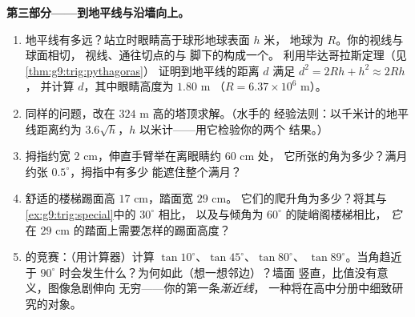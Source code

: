 \begin{problem}
\medskip
\noindent\textbf{第三部分——到地平线与沿墙向上。}
\begin{enumerate}[resume]
  \item 地平线有多远？站立时眼睛高于球形地球表面 $h$ 米，
        地球为 $R$。你的视线与球面相切，
        视线、通往切点的与
        脚下的构成一个。
        利用毕达哥拉斯定理（见\cref{thm:g9:trig:pythagoras}）
        证明到地平线的距离 $d$
        满足 $d^2 = 2Rh + h^2 \approx 2Rh$，
        并计算 $d$，其中眼睛高度为 $1.80$ m
        （$R = 6.37 \times 10^6$ m）。
  \item 同样的问题，改在 $324$ m 高的塔顶求解。（水手的
        经验法则：以千米计的地平线距离约为
        $3.6\sqrt{h}$，$h$ 以米计——用它检验你的两个
        结果。）
  \item 拇指约宽 $2$ cm，伸直手臂举在离眼睛约 $60$ cm 处，
        它所张的角为多少？满月约张
        $0.5^\circ$，拇指中有多少
        能遮住整个满月？
  \item 舒适的楼梯踢面高 $17$ cm，踏面宽 $29$ cm。
        它们的爬升角为多少？将其与
        \cref{ex:g9:trig:special}中的 $30^\circ$ 相比，
        以及与倾角为 $60^\circ$ 的陡峭阁楼梯相比，
        \emph{它}在 $29$ cm 的踏面上需要怎样的踢面高度？
  \item {}的竞赛：（用计算器）计算
        $\tan 10^\circ$、$\tan 45^\circ$、$\tan 80^\circ$、
        $\tan 89^\circ$。当角趋近于
        $90^\circ$ 时会发生什么？为何如此（想一想邻边）？墙面
        竖直，比值没有意义，图像急剧伸向
        无穷——你的第一条\emph{渐近线}，
        一种将在高中分册中细致研究的对象。
\end{enumerate}
\end{problem}
